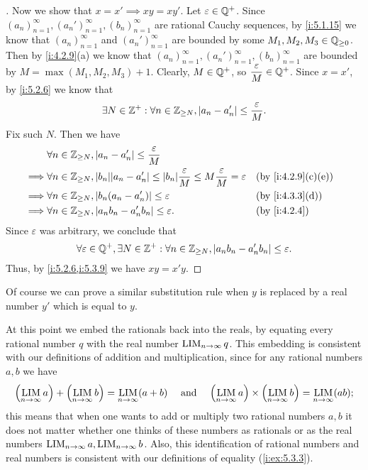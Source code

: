 \begin{proof}[]
  Now we show that \(x = x' \implies xy = xy'\).
  Let \(\varepsilon \in \mathbb{Q}^+\).
  Since \((a_n)_{n = 1}^\infty, (a_n')_{n = 1}^\infty, (b_n)_{n = 1}^\infty\) are rational Cauchy sequences, by \cref{i:5.1.15} we know that \((a_n)_{n = 1}^\infty\) and \((a_n')_{n = 1}^\infty\) are bounded by some \(M_1, M_2, M_3 \in \mathbb{Q}_{\geq 0}\).
  Then by \cref{i:4.2.9}(a) we know that \((a_n)_{n = 1}^\infty, (a_n')_{n = 1}^\infty, (b_n)_{n = 1}^\infty\) are bounded by \(M = \max(M_1, M_2, M_3) + 1\).
  Clearly, \(M \in \mathbb{Q}^+\), so \(\dfrac{\varepsilon}{M} \in \mathbb{Q}^+\).
  Since \(x = x'\), by \cref{i:5.2.6} we know that
  \[
    \exists N \in \mathbb{Z}^+ : \forall n \in \mathbb{Z}_{\geq N}, \left\lvert a_n - a_n'\right\rvert \leq \dfrac{\varepsilon}{M}.
  \]
  Fix such \(N\).
  Then we have
  \begin{align*}
             & \forall n \in \Z_{\geq N}, \abs{a_n - a_n'} \leq \dfrac{\varepsilon}{M}                                                                                        \\
    \implies & \forall n \in \Z_{\geq N}, \abs{b_n} \abs{a_n - a_n'} \leq \abs{b_n} \dfrac{\varepsilon}{M} \leq M \dfrac{\varepsilon}{M} = \varepsilon &  & \by{i:4.2.9}[c,e] \\
    \implies & \forall n \in \Z_{\geq N}, \abs{b_n (a_n - a_n')} \leq \varepsilon                                                                      &  & \by{i:4.3.3}[d]   \\
    \implies & \forall n \in \Z_{\geq N}, \abs{a_n b_n - a_n' b_n} \leq \varepsilon.                                                                   &  & \by{i:4.2.4}
  \end{align*}
  Since \(\varepsilon\) was arbitrary, we conclude that
  \[
    \forall \varepsilon \in \mathbb{Q}^+, \exists N \in \mathbb{Z}^+ : \forall n \in \mathbb{Z}_{\geq N}, \left\lvert a_n b_n - a_n' b_n\right\rvert \leq \varepsilon.
  \]
  Thus, by \cref{i:5.2.6,i:5.3.9} we have \(xy = x'y\).
\end{proof}

\begin{note}
  Of course we can prove a similar substitution rule when \(y\) is replaced by a real number \(y'\) which is equal to \(y\).
\end{note}

\begin{ac}\label{i:ac:5.3.1}
  At this point we embed the rationals back into the reals, by equating every rational number \(q\) with the real number \(\operatorname*{LIM}_{n \to \infty} q\).
  This embedding is consistent with our definitions of addition and multiplication, since for any rational numbers \(a, b\) we have
  \[
    \pa{\LIM_{n \to \infty} a} + \pa{\LIM_{n \to \infty} b} = \LIM_{n \to \infty} (a + b) \quad \text{ and } \quad \pa{\LIM_{n \to \infty} a} \times \pa{\LIM_{n \to \infty} b} = \LIM_{n \to \infty} (ab);
  \]
  this means that when one wants to add or multiply two rational numbers \(a, b\) it does not matter whether one thinks of these numbers as rationals or as the real numbers \(\operatorname*{LIM}_{n \to \infty} a, \operatorname*{LIM}_{n \to \infty} b\).
  Also, this identification of rational numbers and real numbers is consistent with our definitions of equality (\cref{i:ex:5.3.3}).
\end{ac}

